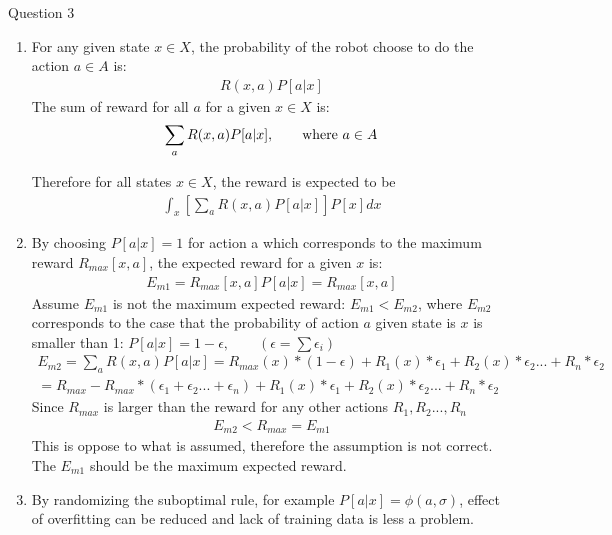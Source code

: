 \documentclass[letterpaper]{article} %
\begin{document}
Question 3
\begin{enumerate}[label={(\roman*)}]
\item
    \textnormal{For any given state $x \in X$, the probability of the robot choose to do the action $a \in A$ is: }
    \begin{align}
    R(x,a)P[a \vert x]
    \end{align}
    \textnormal{The sum of reward for all $a$ for a given $x \in X$ is:}
    \begin{align}
        \sum_a R(x,a)P[a \vert x], \qquad \textnormal{where } a \in A
    \end{align}
    
    \textnormal{Therefore for all states $x \in X$, the reward is expected to be}
    \begin{align}
        \int_x \left[ \sum_a R(x,a)P[a \vert x] \right] P[x] dx
    \end{align}
\item
    \textnormal{By choosing $P[a \vert x]=1$ for action a which corresponds to the maximum reward $R_{max}[x,a]$, the expected reward for a given $x$ is: }
    \begin{align}
        E_{m1}=R_{max}[x,a]P[a \vert x]=R_{max}[x,a]
    \end{align}
    \textnormal{Assume $E_{m1}$ is not the maximum expected reward: $E_{m1}<E_{m2}$, where $E_{m2}$ corresponds to the case that the probability of action $a$ given state is $x$ is smaller than 1: $P[a \vert x]=1-\epsilon, \qquad (\epsilon = \sum \epsilon_i)$}
    \begin{align}
        E_{m2}=\sum_a R(x,a)P[a \vert x]=R_{max}(x)*(1-\epsilon)+R_1(x)*\epsilon_1+R_2(x)*\epsilon_2...+R_n*\epsilon_2\\
        =R_{max}-R_{max}*(\epsilon_1+\epsilon_2...+\epsilon_n)+R_1(x)*\epsilon_1+R_2(x)*\epsilon_2...+R_n*\epsilon_2
    \end{align}
    \textnormal{Since $R_{max}$ is larger than the reward for any other actions $R_1, R_2..., R_n$}
    \begin{align}
        E_{m2}<R_{max}=E_{m1}
    \end{align}
    \textnormal{This is oppose to what is assumed, therefore the assumption is not correct. The $E_{m1}$ should be the maximum expected reward.}
    
\item
  \textnormal{By randomizing the suboptimal rule, for example $P[a \vert x]=\phi(a,\sigma)$, effect of overfitting can be reduced and lack of training data is less a problem.}
\end{enumerate}
\end{document}
